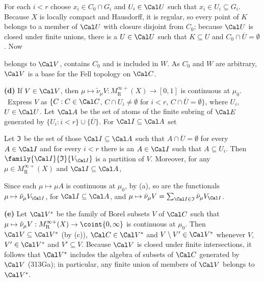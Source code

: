 {

\noindent For each $i<r$ choose $x_i\in C_0\cap G_i$ and
$U_i\in\Cal U$
such that $x_i\in U_i\subseteq G_i$.   Because $X$ is locally compact
and Hausdorff, it is regular, so every point of $K$ belongs to a member
of $\Cal U$ with closure disjoint from $C_0$;  because $\Cal U$ is
closed under finite unions, there is a $U\in\Cal U$ such that
$K\subseteq U$ and $C_0\cap\overline{U}=\emptyset$.   Now


\noindent belongs to $\Cal V$, contains $C_0$ and is included in
$W$.   As $C_0$ and $W$ are arbitrary, $\Cal V$ is a base for the
Fell topology on $\Cal C$.\ \Qed

\medskip

{\bf (d)} If $V\in\Cal V$, then
$\mu\mapsto\tilde\nu_{\mu}V:M^{\infty+}_{\text{R}}(X)\to[0,1]$ is
continuous at $\mu_0$.   \Prf\ Express $V$ as
$\{C:C\in\Cal C$, $C\cap U_i\ne\emptyset$ for $i<r$,
$C\cap\overline{U}=\emptyset\}$, where $U_i$, $U\in\Cal U$.
Let $\Cal A$ be the set of atoms of the finite subring of $\Cal E$
generated by $\{U_i:i<r\}\cup\{\overline{U}\}$.   For
$\Cal I\subseteq\Cal A$ set


\noindent Let $\frak I$ be the set of those $\Cal I\subseteq\Cal A$ such
that $A\cap\overline{U}=\emptyset$ for every $A\in\Cal I$ and for every
$i<r$ there is an $A\in\Cal I$ such that $A\subseteq U_i$.   Then
$\family{\Cal I}{\frak I}{V_{\Cal I}}$ is a partition of $V$.
Moreover, for any $\mu\in M^{\infty+}_{\text{R}}(X)$ and
$\Cal I\subseteq\Cal A$,


\noindent Since each $\mu\mapsto\mu A$ is continuous at $\mu_0$, by (a),
so are the functionals $\mu\mapsto\tilde\nu_{\mu}V_{\Cal I}$, for
$\Cal I\subseteq\Cal A$, and $\mu\mapsto\tilde\nu_{\mu}V
=\sum_{\Cal I\in\frak I}\tilde\nu_{\mu}V_{\Cal I}$.\ \Qed

\medskip

{\bf (e)} Let $\Cal V^*$ be the family of Borel subsets $V$ of $\Cal C$
such that
$\mu\mapsto\tilde\nu_{\mu}V:M^{\infty+}_{\text{R}}(X)\to\coint{0,\infty}$
is continuous at $\mu_0$.   Then $\Cal V\subseteq\Cal V^*$ (by (c)),
$\Cal C\in\Cal V^*$ and $V\setminus V'\in\Cal V^*$ whenever $V$,
$V'\in\Cal V^*$ and $V'\subseteq V$.   Because $\Cal V$ is closed under
finite intersections, it follows that $\Cal V^*$ includes the algebra of
subsets of $\Cal C$ generated by $\Cal V$ (313Ga);  in particular, any
finite union of members of $\Cal V$ belongs to $\Cal V^*$.

}
